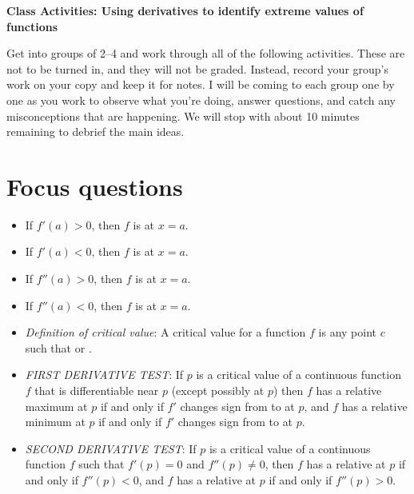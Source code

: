 \documentclass[11pt]{article}
\def\blank{\underline{\hspace{1in}}}
\begin{document}
	
	\thispagestyle{empty}
	\renewcommand{\headrulewidth}{0.0pt}
	\thispagestyle{fancy}
	\lfoot{}
	\cfoot{}
	\rfoot{}	
	
	\vspace*{0in}

		\begin{center}
			\begin{large}
			\textbf{Class Activities: Using derivatives to identify extreme values of functions} \\
			\end{large}
		\end{center}
	
Get into groups of 2--4 and work through all of the following activities. These are not to be turned in, and they will not be graded. Instead, record your group's work on your copy and keep it for notes. I will be coming to each group one by one as you work to observe what you're doing, answer questions, and catch any misconceptions that are happening. We will stop with about 10 minutes remaining to debrief the main ideas. \\

\section{Focus questions}

\begin{itemize}
	\item If $f'(a) > 0$, then $f$ is \blank at $x=a$. 
	\item If $f'(a) < 0$, then $f$ is \blank at $x=a$. 
	\item If $f''(a) > 0$, then $f$ is \blank at $x=a$.
	\item If $f''(a) <  0$, then $f$ is \blank at $x=a$.
	\item \emph{Definition of critical value}: A critical value for a function $f$ is any point $c$ such that \blank or \blank. 
	\item \emph{FIRST DERIVATIVE TEST}: If $p$ is a critical value of a continuous function $f$ that is differentiable near $p$ (except possibly at $p$) then $f$ has a relative maximum at $p$ if and only if $f'$ changes sign from \blank to \blank at $p$, and $f$ has a relative minimum at $p$ if and only if $f'$ changes sign from \blank to \blank at $p$. 
	\item \emph{SECOND DERIVATIVE TEST}: If $p$ is a critical value of a continuous function $f$ such that $f'(p) = 0$ and $f''(p) \neq 0$, then $f$ has a relative \blank at $p$ if and only if $f''(p) < 0$, and $f$ has a relative \blank at $p$ if and only if $f''(p) > 0$. 
\end{itemize}
\end{document}
